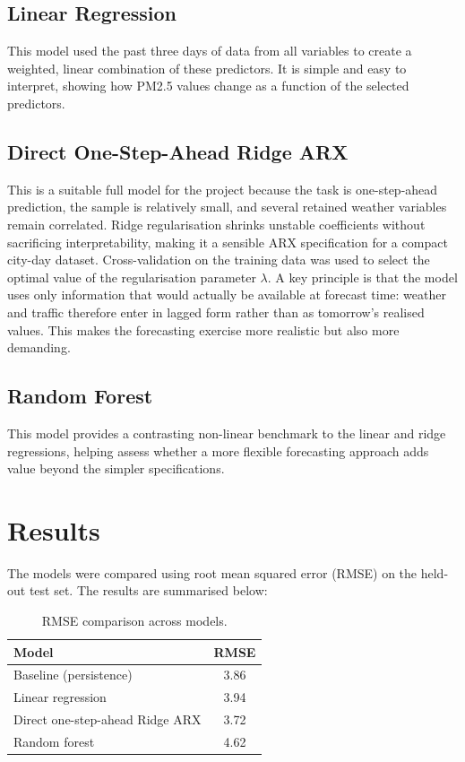 \documentclass[11pt,a4paper]{article}
\begin{document}
	\subsection*{Linear Regression}
	
	This model used the past three days of data from all variables to create a weighted, linear combination of these predictors. It is simple and easy to interpret, showing how PM2.5 values change as a function of the selected predictors.
	
	\subsection*{Direct One-Step-Ahead Ridge ARX}
	This is a suitable full model for the project because the task is one-step-ahead prediction, the sample is relatively small, and several retained weather variables remain correlated. Ridge regularisation shrinks unstable coefficients without sacrificing interpretability, making it a sensible ARX specification for a compact city-day dataset. Cross-validation on the training data was used to select the optimal value of the regularisation parameter \(\lambda\). A key principle is that the model uses only information that would actually be available at forecast time: weather and traffic therefore enter in lagged form rather than as tomorrow's realised values. This makes the forecasting exercise more realistic but also more demanding.
	
	\subsection*{Random Forest}
	This model provides a contrasting non-linear benchmark to the linear and ridge regressions, helping assess whether a more flexible forecasting approach adds value beyond the simpler specifications.
	
	\section{Results}
	
	The models were compared using root mean squared error (RMSE) on the held-out test set. The results are summarised below:
	
	\begin{table}[H]
		\centering
		\caption{RMSE comparison across models.}
		\label{tab:rmse}
		\begin{tabular}{@{}lc@{}}
			\toprule
			\textbf{Model} & \textbf{RMSE} \\
			\midrule
			Baseline (persistence) & 3.86 \\
			Linear regression      & 3.94 \\
			Direct one-step-ahead Ridge ARX & 3.72 \\
			Random forest          & 4.62 \\
			\bottomrule
		\end{tabular}
	\end{table}
	
\end{document}
